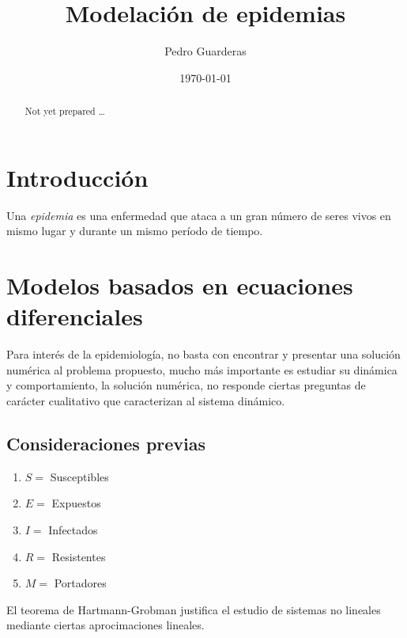 \documentclass[a4paper, 10pt, twoside]{article}
\title{\fontsize{20}{20}\selectfont \textbf{Modelación de epidemias}}
\author{Pedro Guarderas}
\date{\today}
\begin{document}
\pagestyle{artsecstyle}

\maketitle
\tableofcontents

\begin{abstract}
Not yet prepared \ldots
\end{abstract}

\clearpage
\pagestyle{artstyle}
\section{Introducción}

\begin{definition}
Una \emph{epidemia} es una enfermedad que ataca a un gran número de seres vivos en mismo lugar y 
durante un mismo período de tiempo.
\end{definition}

\clearpage
\section{Modelos basados en ecuaciones diferenciales}
Para interés de la epidemiología, no basta con encontrar y presentar una solución numérica al 
problema propuesto, mucho más importante es estudiar su dinámica y comportamiento, la solución 
numérica, no responde ciertas preguntas de carácter cualitativo que caracterizan al sistema 
dinámico.

\subsection{Consideraciones previas}
\begin{enumerate}
	\item $S=$ Susceptibles
	\item $E=$ Expuestos
	\item $I=$ Infectados
	\item $R=$ Resistentes
	\item $M=$ Portadores
\end{enumerate}

El teorema de Hartmann-Grobman justifica el estudio de sistemas no lineales mediante ciertas 
aprocimaciones lineales.
\end{document}
